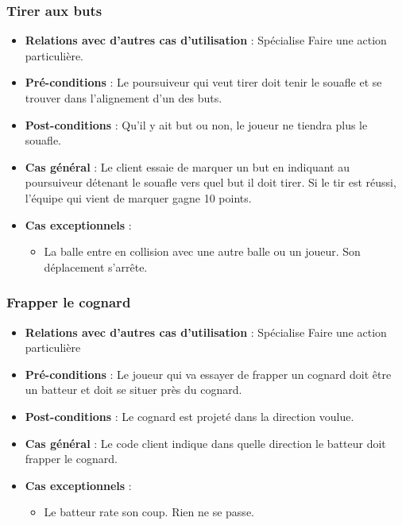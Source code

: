 \documentclass[a4paper,titlepage]{scrreprt}
\begin{document}
     \subsubsection{Tirer aux buts}
      \begin{itemize}
        \item \textbf{Relations avec d'autres cas d'utilisation}  : Spécialise Faire une action particulière.
        \item \textbf{Pré-conditions} : Le poursuiveur qui veut tirer doit tenir le souafle et se trouver dans l’alignement d’un des buts. 
        \item \textbf{Post-conditions} : Qu’il y ait but ou non, le joueur ne tiendra plus le souafle.
        \item \textbf{Cas général} : Le client essaie de marquer un but en indiquant au poursuiveur détenant le souafle vers quel but il doit tirer.  Si le tir est réussi, l'équipe qui vient de marquer gagne 10 points. %
         \item \textbf{Cas exceptionnels} :
           \begin{itemize}
            \item La balle entre en collision avec une autre balle ou un joueur. Son déplacement s'arrête.
           \end{itemize}
      \end{itemize}

    \subsubsection{Frapper le cognard}
      \begin{itemize}
        \item \textbf{Relations avec d'autres cas d'utilisation}  : Spécialise Faire une action particulière
        \item \textbf{Pré-conditions} : Le joueur qui va essayer de frapper un \gls{cognard} doit être un batteur et doit se situer près du cognard.
        \item \textbf{Post-conditions} : Le cognard est projeté dans la direction voulue.
        \item \textbf{Cas général} : Le code client indique dans quelle direction le batteur doit frapper le cognard.
        \item \textbf{Cas exceptionnels} :
          \begin{itemize}
        \item Le batteur rate son coup. Rien ne se passe.%
          \end{itemize}
      \end{itemize}
\end{document}
